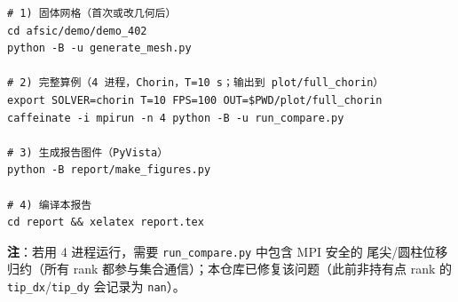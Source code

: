 \documentclass[11pt]{ctexart}
\begin{document}
\begin{verbatim}
# 1) 固体网格（首次或改几何后）
cd afsic/demo/demo_402
python -B -u generate_mesh.py

# 2) 完整算例（4 进程，Chorin，T=10 s；输出到 plot/full_chorin）
export SOLVER=chorin T=10 FPS=100 OUT=$PWD/plot/full_chorin
caffeinate -i mpirun -n 4 python -B -u run_compare.py

# 3) 生成报告图件（PyVista）
python -B report/make_figures.py

# 4) 编译本报告
cd report && xelatex report.tex
\end{verbatim}

\noindent\textbf{注}：若用 4 进程运行，需要 \texttt{run\_compare.py} 中包含 MPI 安全的
尾尖/圆柱位移归约（所有 rank 都参与集合通信）；本仓库已修复该问题（此前非持有点
rank 的 \texttt{tip\_dx}/\texttt{tip\_dy} 会记录为 \texttt{nan}）。
\end{document}
